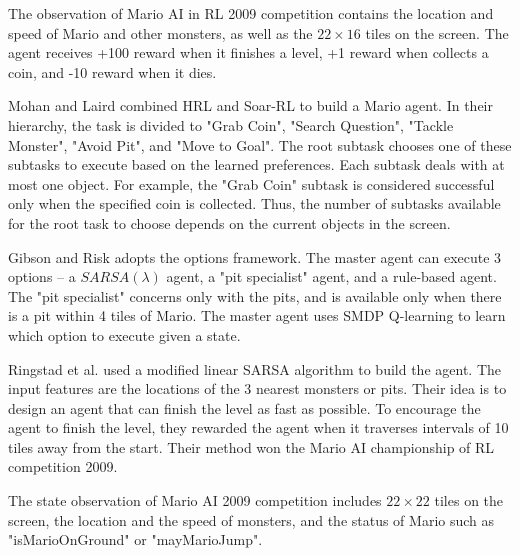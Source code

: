 The observation of Mario AI in RL 2009 competition 
contains the location and speed of Mario and other monsters, as well as
the $22 \times 16$ tiles on the screen.
The agent receives +100 reward when it finishes a level, +1 reward when collects
a coin, and -10 reward when it dies.


Mohan and Laird \cite{Mohan09} combined HRL and Soar-RL \cite{Nason05} to build
a Mario agent. In their hierarchy, the task is divided to "Grab Coin", "Search Question", "Tackle Monster",
"Avoid Pit", and "Move to Goal". 
The root subtask chooses one of these subtasks to execute based on the learned
preferences. Each subtask deals with at most one object. For example, the
"Grab Coin" subtask is considered successful only when the specified 
coin is collected. Thus, the number of subtasks available for the root task to choose
depends on the current objects in the screen.

Gibson and Risk \cite{Gibson09} adopts the options framework.
The master agent can execute 3 options -- a $SARSA(\lambda)$ agent, a "pit specialist" agent, and a
rule-based agent. The "pit specialist" concerns only with the pits, and is available only when
there is a pit within 4 tiles of Mario. 
The master agent uses SMDP Q-learning to learn which option to execute given a state.

Ringstad et al. \cite{Paul09} 
used a modified linear SARSA algorithm to build the agent.
The input features are the locations of the 3 nearest monsters or pits.
Their idea is to design an agent that can finish the level as fast as possible.
To encourage the agent to finish the level, they rewarded the agent when it traverses
intervals of 10 tiles away from the start.
Their method won the Mario AI championship of RL competition 2009.


The state observation of Mario AI 2009 competition \cite{Robin09} includes $22 \times 22$ tiles on the screen, the location and the speed of monsters, 
and the status of Mario such as "isMarioOnGround" or "mayMarioJump".

